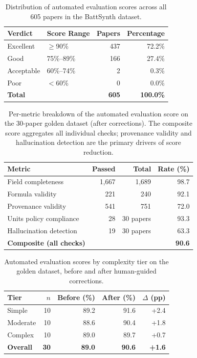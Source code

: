 \documentclass[12pt,a4paper]{article}
\begin{document}
\begin{table}[htbp]
\centering
\caption{Distribution of automated evaluation scores across all 605 papers in the BattSynth dataset.}
\label{tab:score_dist}
\begin{tabular}{llrr}
\toprule
Verdict & Score Range & Papers & Percentage \\
\midrule
Excellent & $\geq$90\% & 437 & 72.2\% \\
Good & 75\%--89\% & 166 & 27.4\% \\
Acceptable & 60\%--74\% & 2 & 0.3\% \\
Poor & $<$60\% & 0 & 0.0\% \\
\midrule
\textbf{Total} & & \textbf{605} & \textbf{100.0\%} \\
\bottomrule
\end{tabular}
\end{table}

\begin{table}[htbp]
\centering
\caption{Per-metric breakdown of the automated evaluation score on the 30-paper golden dataset (after corrections). The composite score aggregates all individual checks; provenance validity and hallucination detection are the primary drivers of score reduction.}
\label{tab:metric_breakdown}
\begin{tabular}{lrrr}
\toprule
Metric & Passed & Total & Rate (\%) \\
\midrule
Field completeness & 1,667 & 1,689 & 98.7 \\
Formula validity & 221 & 240 & 92.1 \\
Provenance validity & 541 & 751 & 72.0 \\
Units policy compliance & 28 & 30 papers & 93.3 \\
Hallucination detection & 19 & 30 papers & 63.3 \\
\midrule
\textbf{Composite (all checks)} & & & \textbf{90.6} \\
\bottomrule
\end{tabular}
\end{table}

\begin{table}[htbp]
\centering
\caption{Automated evaluation scores by complexity tier on the golden dataset, before and after human-guided corrections.}
\label{tab:eval_by_tier}
\begin{tabular}{lrrrr}
\toprule
Tier & $n$ & Before (\%) & After (\%) & $\Delta$ (pp) \\
\midrule
Simple & 10 & 89.2 & 91.6 & +2.4 \\
Moderate & 10 & 88.6 & 90.4 & +1.8 \\
Complex & 10 & 89.0 & 89.7 & +0.7 \\
\midrule
\textbf{Overall} & \textbf{30} & \textbf{89.0} & \textbf{90.6} & \textbf{+1.6} \\
\bottomrule
\end{tabular}
\end{table}
\end{document}

